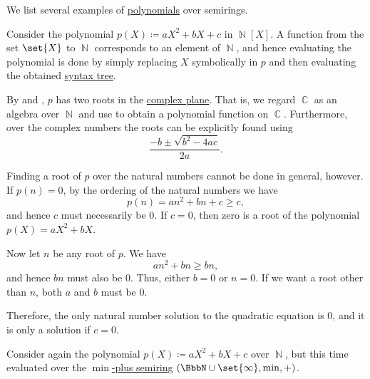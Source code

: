 \begin{example}\label{ex:def:polynomial_semiring}
  We list several examples of \hyperref[def:polynomial_semiring]{polynomials} over semirings.
  \begin{thmenum}
     Consider the polynomial \( p(X) \coloneqq aX^2 + bX + c \) in \( \BbbN[X] \). A function from the set \( \set{ X } \) to \( \BbbN \) corresponds to an element of \( \BbbN \), and hence evaluating the polynomial is done by simply replacing \( X \) symbolically in \( p \) and then evaluating the obtained \hyperref[rem:binary_operation_syntax_trees]{syntax tree}.

    By  and , \( p \) has two roots in the \hyperref[def:set_of_complex_numbers]{complex plane}. That is, we regard \( \BbbC \) as an algebra over \( \BbbN \) and use  to obtain a polynomial function on \( \BbbC \). Furthermore, over the complex numbers the roots can be explicitly found using
    \begin{equation*}
      \frac {-b \pm \sqrt{b^2 - 4ac}} {2a}.
    \end{equation*}

    Finding a root of \( p \) over the natural numbers cannot be done in general, however. If \( p(n) = 0 \), by the ordering of the natural numbers we have
    \begin{equation*}
      p(n) = an^2 + bn + c \geq c,
    \end{equation*}
    and hence \( c \) must necessarily be \( 0 \). If \( c = 0 \), then zero is a root of the polynomial \( p(X) = aX^2 + bX \).

    Now let \( n \) be any root of \( p \). We have
    \begin{equation*}
      an^2 + bn \geq bn,
    \end{equation*}
    and hence \( bn \) must also be \( 0 \). Thus, either \( b = 0 \) or \( n = 0 \). If we want a root other than \( n \), both \( a \) and \( b \) must be \( 0 \).

    Therefore, the only natural number solution to the quadratic equation is \( 0 \), and it is only a solution if \( c = 0 \).

     Consider again the polynomial \( p(X) \coloneqq aX^2 + bX + c \) over \( \BbbN \), but this time evaluated over the \hyperref[def:tropical_semiring]{\( \min \)-plus semiring} \( (\BbbN \cup \set{ \infty }, \min, +) \).


\end{thmenum}
\end{example}
